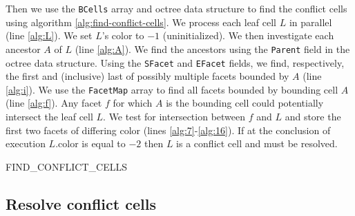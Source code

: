 \documentclass[submission]{gmp2017}
\begin{document}
\begin{figure}
  \label{fig:scc-sort}
\end{figure}

Then we use the \texttt{BCells} array and octree data structure to find the conflict cells using algorithm \ref{alg:find-conflict-cells}. We process each leaf cell $L$ in parallel (line \ref{alg:L}). We set $L$'s color to $-1$ (uninitialized). We then investigate each ancestor $A$ of $L$ (line \ref{alg:A}). We find the ancestors using the \texttt{Parent} field in the octree data structure. Using the \texttt{SFacet} and \texttt{EFacet} fields, we find, respectively, the first and (inclusive) last of possibly multiple facets bounded by $A$ (line \ref{alg:i}). We use the \texttt{FacetMap} array to find all facets bounded by bounding cell $A$ (line \ref{alg:f}). Any facet $f$ for which $A$ is the bounding cell could potentially intersect the leaf cell $L$. We test for intersection between $f$ and $L$ and store the first two facets of differing color (lines \ref{alg:7}-\ref{alg:16}). If at the conclusion of execution $L$.color is equal to $-2$ then $L$ is a conflict cell and must be resolved.

\algorithmspace
\begin{algorithm}
  \DontPrintSemicolon
  \LinesNumbered
  \BlankLine
  \ForPar{leaf cell $L$}{ \label{alg:L}
    $L$.color = -1\;
    \ForEach{cell $A$ in \directAncestors{$L$}}{  \label{alg:A}
      \ForEach{i in \{SFacets[A]$\dots$EFacets[A]\}}{
        $f$ := Facets[FacetMap[i]]\; \label{alg:f}
        \If{$f$ intersects $L$}{ \label{alg:7}
          \If{$L$.color == -1} {
            $L$.color = $f$.color\;
            $L$.facet[0] = $f$\;
          }
          \ElseIf{$L$.color $\ne$ $f$.color} {
            $L$.color = -2\;
            $L$.facet[1] = $f$\;
          }
        } \label{alg:16}
      }
    }
  } \label{alg:quadtree_intersections_end}
\caption{FIND\_CONFLICT\_CELLS}
\label{alg:find-conflict-cells}
\end{algorithm}
\algorithmspace

\subsection{Resolve conflict cells}
\end{document}
